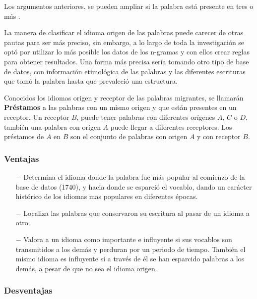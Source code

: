 Los argumentos anteriores, se pueden ampliar si la palabra está presente en tres o más .

\newpage
La manera de clasificar el idioma origen de las palabras puede carecer de otras pautas para ser más preciso, sin embargo, a lo largo de toda la investigación se optó por utilizar lo más posible los datos de los n-gramas y  con ellos crear reglas para obtener resultados.  Una forma más precisa sería tomando otro tipo de base de datos, con información etimológica de las palabras y las diferentes escrituras que tomó la palabra hasta que prevaleció una estructura.  

Conocidos los idiomas origen y receptor de las palabras migrantes, se llamarán \textbf{Préstamos} a las palabras con un mismo origen y que están  presentes en un receptor.  Un receptor $\textit{B}$, puede tener palabras con diferentes orígenes $\textit{A}$, $\textit{C}$ o $\textit{D}$, también una palabra con origen $\textit{A}$ puede llegar a diferentes receptores.  Los préstamos de $\textit{A}$  en $\textit{B}$  son el conjunto de palabras con origen  $\textit{A}$  y con receptor $\textit{B}$.     


\subsubsection*{Ventajas}


\begin{itemize}
	
	\item [$-$] Determina el idioma donde la palabra fue más popular al comienzo de la base de datos (1740), y hacia donde se esparció el vocablo, dando un carácter histórico de los idiomas mas populares en diferentes épocas. 
	
	\item [$-$] Localiza las palabras que conservaron su escritura al pasar de un idioma a otro. 
	
	\item [$-$] Valora a un idioma como importante e influyente si sus vocablos son transmitidos a los demás y perduran por un periodo de tiempo. También el mismo idioma es influyente si a través de él se han esparcido palabras a los demás, a pesar de que no sea el idioma origen. 
	
\end{itemize}


\subsubsection*{Desventajas}


